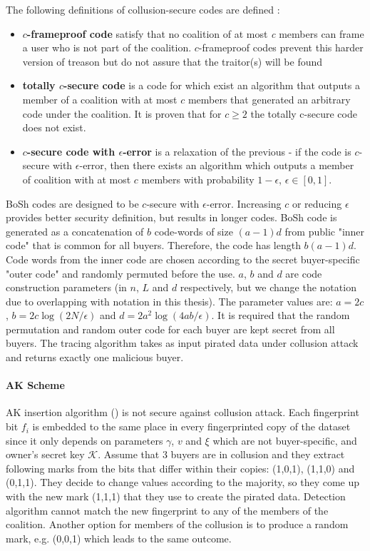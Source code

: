 The following definitions of collusion-secure codes are defined \cite{boneh1998collusion}:
\begin{itemize}
    \item \textbf{$c$-frameproof code} satisfy that no coalition of at most \textit{c} members can frame a user who is not part of the coalition. $c$-frameproof codes prevent this harder version of treason but do not assure that the traitor(s) will be found
    
    \item \textbf{totally $c$-secure code} is a code for which exist an algorithm that outputs a member of a coalition with at most $c$ members that generated an arbitrary code under the coalition. It is proven that for $c \geq 2$ the totally c-secure code does not exist.
    
    \item \textbf{$c$-secure code with $\epsilon$-error} is a relaxation of the previous - if the code is $c$-secure with $\epsilon$-error, then there exists an algorithm which outputs a member of coalition with at most $c$ members with probability $1-\epsilon$, $\epsilon \in [0,1]$. 
\end{itemize}

BoSh codes are designed to be $c$-secure with $\epsilon$-error. 
Increasing $c$ or reducing $\epsilon$ provides better security definition, but results in longer codes.
BoSh code is generated as a concatenation of $b$ code-words of size $(a-1)d$ from public "inner code" that is common for all buyers. 
Therefore, the code has length $b(a-1)d$.
Code words from the inner code are chosen according to the secret buyer-specific "outer code" and randomly permuted before the use. 
$a$, $b$ and $d$ are code construction parameters (in \cite{boneh1998collusion} $n$, $L$ and $d$ respectively, but we change the notation due to overlapping with notation in this thesis).
The parameter values are: $a=2c$, $b=2c\log(2N/\epsilon)$ and $d=2a^2 \log(4ab/\epsilon)$.
It is required that the random permutation and random outer code for each buyer are kept secret from all buyers.
The tracing algorithm takes as input pirated data under collusion attack and returns exactly one malicious buyer. 

\paragraph{AK Scheme}
AK insertion algorithm () is not secure against collusion attack. 
Each fingerprint bit $f_i$ is embedded to the same place in every fingerprinted copy of the dataset since it only depends on parameters $\gamma$, $v$ and $\xi$ which are not buyer-specific, and owner's secret key $\mathcal{K}$.
Assume that 3 buyers are in collusion and they extract following marks from the bits that differ within their copies: (1,0,1), (1,1,0) and (0,1,1). 
They decide to change values according to the majority, so they come up with the new mark (1,1,1) that they use to create the pirated data. 
Detection algorithm cannot match the new fingerprint to any of the members of the coalition. 
Another option for members of the collusion is to produce a random mark, e.g. (0,0,1) which leads to the same outcome. 

